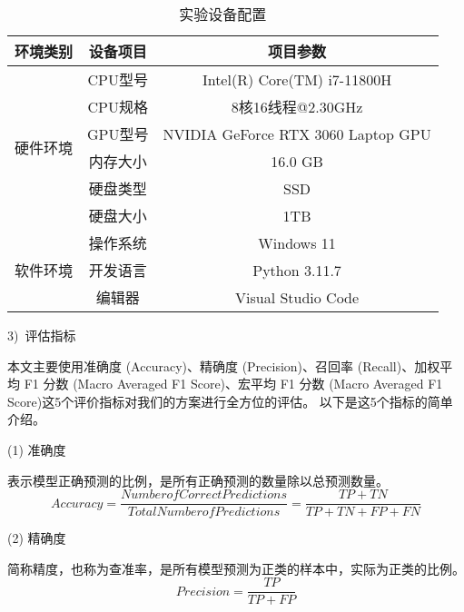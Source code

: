 \begin{table}[htbp]
	\caption{实验设备配置}
	\label{tab:env_setting}
	\centering
	\begin{tabular}{ccc}
		\toprule
		\textbf{环境类别}         & \textbf{设备项目} & \textbf{项目参数}                      \\
		\midrule
		\multirow{6}{*}{硬件环境} & CPU型号         & Intel(R) Core(TM) i7-11800H        \\
		                      & CPU规格         & 8核16线程@2.30GHz                     \\
		                      & GPU型号         & NVIDIA GeForce RTX 3060 Laptop GPU \\
		                      & 内存大小          & 16.0 GB                            \\
		                      & 硬盘类型          & SSD                                \\
		                      & 硬盘大小          & 1TB                                \\
		\hline
		\multirow{3}{*}{软件环境} & 操作系统          & Windows 11                         \\
		                      & 开发语言          & Python 3.11.7                      \\
		                      & 编辑器           & Visual Studio Code                 \\
		\bottomrule
	\end{tabular}
\end{table}

3)~评估指标\par
本文主要使用准确度 (Accuracy)、精确度 (Precision)、召回率 (Recall)、加权平均 F1 分数 (Macro Averaged F1 Score)、宏平均 F1 分数 (Macro Averaged F1 Score)这5个评价指标对我们的方案进行全方位的评估。
以下是这5个指标的简单介绍。\par
(1) 准确度\par
表示模型正确预测的比例，是所有正确预测的数量除以总预测数量。
\begin{equation}
	\label{eq:val_score1}
	Accuracy = \frac{Number of Correct Predictions}{Total Number of Predictions} = \frac{TP + TN}{TP + TN + FP + FN}
\end{equation}

(2) 精确度\par
简称精度，也称为查准率，是所有模型预测为正类的样本中，实际为正类的比例。
\begin{equation}
	\label{eq:val_score2}
	Precision = \frac{TP}{TP + FP}
\end{equation}

